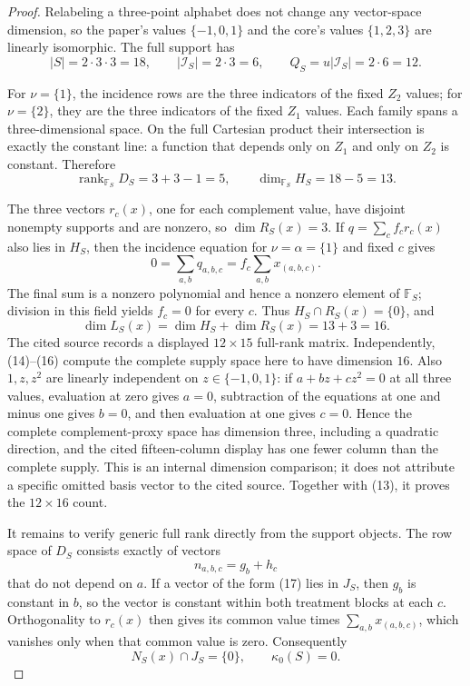\documentclass{article}
\begin{document}
\begin{proof}
Relabeling a three-point alphabet does not change any vector-space dimension, so the paper's values \(\{-1,0,1\}\) and the core's values \(\{1,2,3\}\) are linearly isomorphic.  The full support has
\[
|S|=2\cdot3\cdot3=18,
\qquad
|\mathcal I_S|=2\cdot3=6,
\qquad
Q_S=u|\mathcal I_S|=2\cdot6=12.
\tag{13}
\]

For \(\nu=\{1\}\), the incidence rows are the three indicators of the fixed \(Z_2\) values; for \(\nu=\{2\}\), they are the three indicators of the fixed \(Z_1\) values.  Each family spans a three-dimensional space.  On the full Cartesian product their intersection is exactly the constant line: a function that depends only on \(Z_1\) and only on \(Z_2\) is constant.  Therefore
\[
\operatorname{rank}_{\mathbb F_S}D_S=3+3-1=5,
\qquad
\dim_{\mathbb F_S}H_S=18-5=13.
\tag{14}
\]

The three vectors \(r_c(x)\), one for each complement value, have disjoint nonempty supports and are nonzero, so \(\dim R_S(x)=3\).  If \(q=\sum_c f_c r_c(x)\) also lies in \(H_S\), then the incidence equation for \(\nu=\alpha=\{1\}\) and fixed \(c\) gives
\[
0=\sum_{a,b}q_{a,b,c}
=f_c\sum_{a,b}x_{(a,b,c)}.
\tag{15}
\]
The final sum is a nonzero polynomial and hence a nonzero element of \(\mathbb F_S\); division in this field yields \(f_c=0\) for every \(c\).  Thus \(H_S\cap R_S(x)=\{0\}\), and
\[
\dim L_S(x)=\dim H_S+\dim R_S(x)=13+3=16.
\tag{16}
\]
The cited source records a displayed \(12\times15\) full-rank matrix.  Independently, (14)--(16) compute the complete supply space here to have dimension \(16\).  Also \(1,z,z^2\) are linearly independent on \(z\in\{-1,0,1\}\): if \(a+bz+cz^2=0\) at all three values, evaluation at zero gives \(a=0\), subtraction of the equations at one and minus one gives \(b=0\), and then evaluation at one gives \(c=0\).  Hence the complete complement-proxy space has dimension three, including a quadratic direction, and the cited fifteen-column display has one fewer column than the complete supply.  This is an internal dimension comparison; it does not attribute a specific omitted basis vector to the cited source.  Together with (13), it proves the \(12\times16\) count.

It remains to verify generic full rank directly from the support objects.  The row space of \(D_S\) consists exactly of vectors
\[
n_{a,b,c}=g_b+h_c
\tag{17}
\]
that do not depend on \(a\).  If a vector of the form (17) lies in \(J_S\), then \(g_b\) is constant in \(b\), so the vector is constant within both treatment blocks at each \(c\).  Orthogonality to \(r_c(x)\) then gives its common value times \(\sum_{a,b}x_{(a,b,c)}\), which vanishes only when that common value is zero.  Consequently
\[
N_S(x)\cap J_S=\{0\},
\qquad
\kappa_0(S)=0.
\tag{18}
\]


\end{proof}
\end{document}
